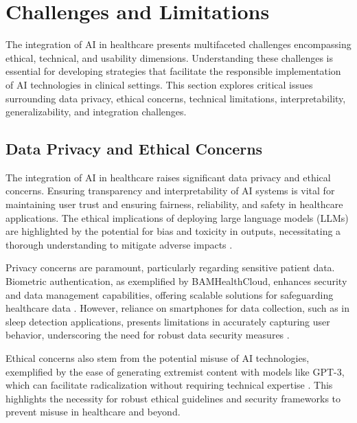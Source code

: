 \section{Challenges and Limitations} \label{sec:Challenges and Limitations}

The integration of AI in healthcare presents multifaceted challenges encompassing ethical, technical, and usability dimensions. Understanding these challenges is essential for developing strategies that facilitate the responsible implementation of AI technologies in clinical settings. This section explores critical issues surrounding data privacy, ethical concerns, technical limitations, interpretability, generalizability, and integration challenges.

\subsection{Data Privacy and Ethical Concerns} \label{subsec:Data Privacy and Ethical Concerns}

The integration of AI in healthcare raises significant data privacy and ethical concerns. Ensuring transparency and interpretability of AI systems is vital for maintaining user trust and ensuring fairness, reliability, and safety in healthcare applications. The ethical implications of deploying large language models (LLMs) are highlighted by the potential for bias and toxicity in outputs, necessitating a thorough understanding to mitigate adverse impacts \cite{chowdhery2023palm}.

Privacy concerns are paramount, particularly regarding sensitive patient data. Biometric authentication, as exemplified by BAMHealthCloud, enhances security and data management capabilities, offering scalable solutions for safeguarding healthcare data \cite{shakil2017bamhealthcloudbiometricauthenticationdata}. However, reliance on smartphones for data collection, such as in sleep detection applications, presents limitations in accurately capturing user behavior, underscoring the need for robust data security measures \cite{jeong2016predictiveanalyticsusingsmartphone}.

Ethical concerns also stem from the potential misuse of AI technologies, exemplified by the ease of generating extremist content with models like GPT-3, which can facilitate radicalization without requiring technical expertise \cite{mcguffie2020radicalizationrisksgpt3advanced}. This highlights the necessity for robust ethical guidelines and security frameworks to prevent misuse in healthcare and beyond.


